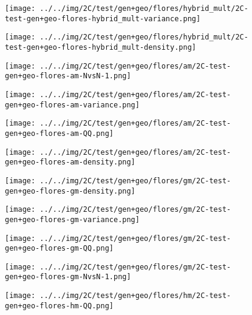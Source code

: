 \begin{figure}[H]
\centering	\texttt{[image: ../../img/2C/test/gen+geo/flores/hybrid\_mult/2C-test-gen+geo-flores-hybrid\_mult-variance.png]}
\end{figure}
\begin{figure}[H]
\centering	\texttt{[image: ../../img/2C/test/gen+geo/flores/hybrid\_mult/2C-test-gen+geo-flores-hybrid\_mult-density.png]}
\end{figure}
\begin{figure}[H]
\centering	\texttt{[image: ../../img/2C/test/gen+geo/flores/am/2C-test-gen+geo-flores-am-NvsN-1.png]}
\end{figure}
\begin{figure}[H]
\centering	\texttt{[image: ../../img/2C/test/gen+geo/flores/am/2C-test-gen+geo-flores-am-variance.png]}
\end{figure}
\begin{figure}[H]
\centering	\texttt{[image: ../../img/2C/test/gen+geo/flores/am/2C-test-gen+geo-flores-am-QQ.png]}
\end{figure}
\begin{figure}[H]
\centering	\texttt{[image: ../../img/2C/test/gen+geo/flores/am/2C-test-gen+geo-flores-am-density.png]}
\end{figure}
\begin{figure}[H]
\centering	\texttt{[image: ../../img/2C/test/gen+geo/flores/gm/2C-test-gen+geo-flores-gm-density.png]}
\end{figure}
\begin{figure}[H]
\centering	\texttt{[image: ../../img/2C/test/gen+geo/flores/gm/2C-test-gen+geo-flores-gm-variance.png]}
\end{figure}
\begin{figure}[H]
\centering	\texttt{[image: ../../img/2C/test/gen+geo/flores/gm/2C-test-gen+geo-flores-gm-QQ.png]}
\end{figure}
\begin{figure}[H]
\centering	\texttt{[image: ../../img/2C/test/gen+geo/flores/gm/2C-test-gen+geo-flores-gm-NvsN-1.png]}
\end{figure}
\begin{figure}[H]
\centering	\texttt{[image: ../../img/2C/test/gen+geo/flores/hm/2C-test-gen+geo-flores-hm-QQ.png]}
\end{figure}
